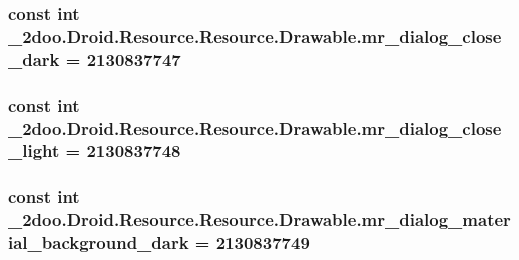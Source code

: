 \hypertarget{class__2doo_1_1_droid_1_1_resource_1_1_drawable_56098ca40b06bed0229a821a8dea55db}{
\subsubsection[{mr\_\-dialog\_\-close\_\-dark}]{\setlength{\rightskip}{0pt plus 5cm}const int \_\-2doo.Droid.Resource.Resource.Drawable.mr\_\-dialog\_\-close\_\-dark = 2130837747}}
\label{class__2doo_1_1_droid_1_1_resource_1_1_drawable_56098ca40b06bed0229a821a8dea55db}


\hypertarget{class__2doo_1_1_droid_1_1_resource_1_1_drawable_2adf42664feeab4cd218c972043f3d0b}{
\subsubsection[{mr\_\-dialog\_\-close\_\-light}]{\setlength{\rightskip}{0pt plus 5cm}const int \_\-2doo.Droid.Resource.Resource.Drawable.mr\_\-dialog\_\-close\_\-light = 2130837748}}
\label{class__2doo_1_1_droid_1_1_resource_1_1_drawable_2adf42664feeab4cd218c972043f3d0b}


\hypertarget{class__2doo_1_1_droid_1_1_resource_1_1_drawable_7ba48c7f4ed66571f264852b7159b573}{
\subsubsection[{mr\_\-dialog\_\-material\_\-background\_\-dark}]{\setlength{\rightskip}{0pt plus 5cm}const int \_\-2doo.Droid.Resource.Resource.Drawable.mr\_\-dialog\_\-material\_\-background\_\-dark = 2130837749}}
\label{class__2doo_1_1_droid_1_1_resource_1_1_drawable_7ba48c7f4ed66571f264852b7159b573}


